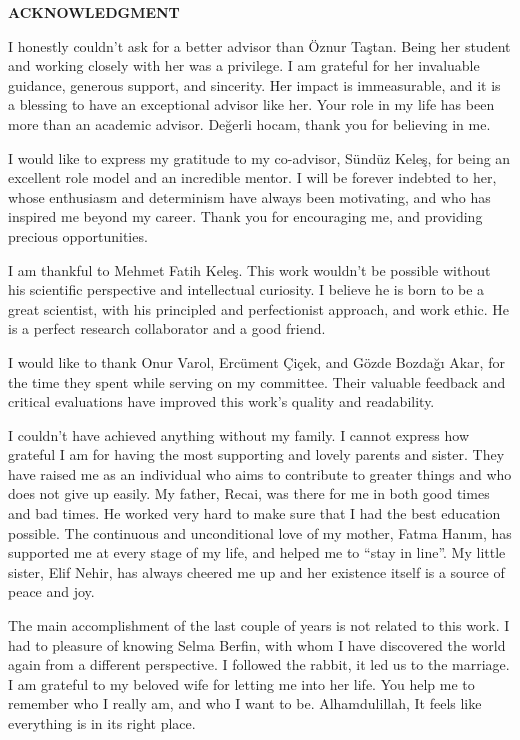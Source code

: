 \clearpage
\setlength{\parindent}{0pt}
\begin{center}
	\MakeUppercase{\textbf{acknowledgment}} \\ [3\baselineskip]
\end{center}

I honestly couldn't ask for a better advisor than Öznur Taştan.
Being her student and working closely with her was a privilege.
I am grateful for her invaluable guidance, generous support, and sincerity.
Her impact is immeasurable, and it is a blessing to have an exceptional advisor like her.
Your role in my life has been more than an academic advisor.
Değerli hocam, thank you for believing in me.

I would like to express my gratitude to my co-advisor, Sündüz Keleş, for being an excellent role model and an incredible mentor.
I will be forever indebted to her, whose enthusiasm and determinism have always been motivating, and who has inspired me beyond my career.
Thank you for encouraging me, and providing precious opportunities.

I am thankful to Mehmet Fatih Keleş.
This work wouldn't be possible without his scientific perspective and intellectual curiosity.
I believe he is born to be a great scientist, with his principled and perfectionist approach, and work ethic.
He is a perfect research collaborator and a good friend.

I would like to thank Onur Varol, Ercüment Çiçek, and Gözde Bozdağı Akar, for the time they spent while serving on my committee.
Their valuable feedback and critical evaluations have improved this work's quality and readability.


I couldn't have achieved anything without my family.
I cannot express how grateful I am for having the most supporting and lovely parents and sister.
They have raised me as an individual who aims to contribute to greater things and who does not give up easily.
My father, Recai, was there for me in both good times and bad times.
He worked very hard to make sure that I had the best education possible.
The continuous and unconditional love of my mother, Fatma Hanım, has supported me at every stage of my life, and helped me to ``stay in line''.
My little sister, Elif Nehir, has always cheered me up and her existence itself is a source of peace and joy.

The main accomplishment of the last couple of years is not related to this work.
I had to pleasure of knowing Selma Berfin, with whom I have discovered the world again from a different perspective.
I followed the rabbit, it led us to the marriage.
I am grateful to my beloved wife for letting me into her life.
You help me to remember who I really am, and who I want to be.
Alhamdulillah, It feels like everything is in its right place.
